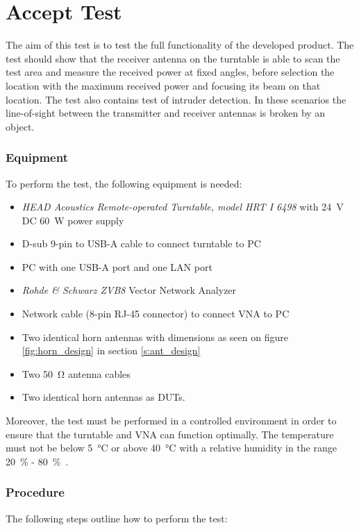 \section{Accept Test} \label{s:accept_test}
The aim of this test is to test the full functionality of the developed product. The test should show that the receiver antenna on the turntable is able to scan the test area and measure the received power at fixed angles, before selection the location with the maximum received power and focusing its beam on that location. The test also contains test of intruder detection. In these scenarios the line-of-sight between the transmitter and receiver antennas is broken by an object. 

\subsubsection{Equipment}
To perform the test, the following equipment is needed:

\begin{itemize}
    \item \textit{HEAD Acoustics Remote-operated Turntable, model HRT I 6498} with \SI{24}{\volt} DC \SI{60}{W} power supply
    \item D-sub 9-pin to USB-A cable to connect turntable to PC
    \item PC with one USB-A port and one LAN port
    \item \textit{Rohde \& Schwarz ZVB8} Vector Network Analyzer
    \item Network cable (8-pin RJ-45 connector) to connect VNA to PC
    \item Two identical horn antennas with dimensions as seen on figure \ref{fig:horn_design} in section \ref{s:ant_design}
    \item Two \SI{50}{\ohm} antenna cables
    \item Two identical horn antennas as DUTs.
\end{itemize}

Moreover, the test must be performed in a controlled environment in order to ensure that the turntable and VNA can function optimally. The temperature must not be below \SI{5}{\celsius} or above \SI{40}{\celsius} with a relative humidity in the range \SI{20}{\percent} - \SI{80}{\percent}~\cite{hrt_i_data_sheet}\cite{vna_data_sheet_spec}.

\subsubsection{Procedure}
The following steps outline how to perform the test:


